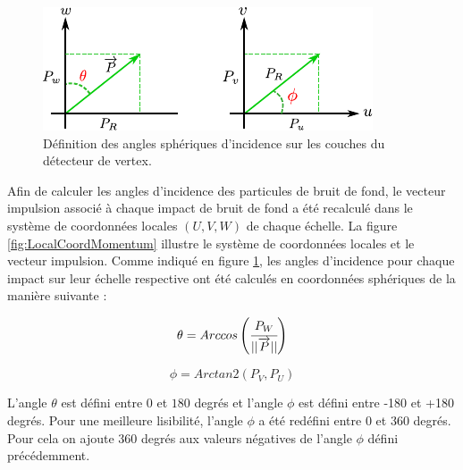   \begin{figure}[!htb]
    \begin{center}
      \includegraphics[scale=1.8]{./figures/track_tilts_local_frame.pdf}
      \caption{D\'efinition des angles sph\'eriques d'incidence sur les couches du d\'etecteur de vertex.}
      \label{fig:track_Tilts_Spherical_Coord}
    \end{center}
  \end{figure}
  
  Afin de calculer les angles d'incidence des particules de bruit de fond, le vecteur impulsion associ\'e \`a chaque impact de bruit de fond a \'et\'e recalcul\'e dans le syst\`eme de coordonn\'ees locales $(U,V,W)$ de chaque \'echelle. La figure \ref{fig:LocalCoordMomentum} illustre le syst\`eme de coordonn\'ees locales et le vecteur impulsion. Comme indiqu\'e en figure \ref{fig:track_Tilts_Spherical_Coord}, les angles d'incidence pour chaque impact sur leur \'echelle respective ont \'et\'e calcul\'es en coordonn\'ees sph\'eriques de la mani\`ere suivante : 
  
  \begin{equation}
   \theta = Arccos\left(\cfrac{P_{W}}{||\overrightarrow{P}||} \right)
  \end{equation}

  \begin{equation}
   \phi = Arctan2\left(P_{V}, P_{U} \right)
  \end{equation}

  L'angle $\theta$ est d\'efini entre $0$ et $180$ degr\'es et l'angle $\phi$ est d\'efini entre -180 et +180 degr\'es. Pour une meilleure lisibilit\'e, l'angle $\phi$ a \'et\'e red\'efini entre 0 et 360 degr\'es. Pour cela on ajoute 360 degr\'es aux valeurs n\'egatives de l'angle $\phi$ d\'efini pr\'ec\'edemment.
  
  \medskip
  
